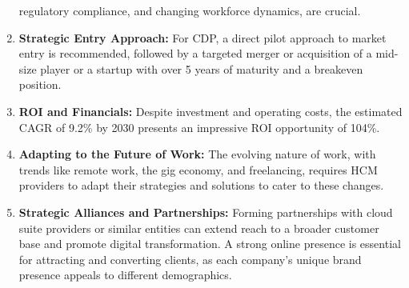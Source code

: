 \documentclass[
  a4paper,
]{book}
\begin{document}
\begin{enumerate}
  regulatory compliance, and changing workforce dynamics, are crucial.
\item
  \textbf{Strategic Entry Approach:} For CDP, a direct pilot approach to
  market entry is recommended, followed by a targeted merger or
  acquisition of a mid-size player or a startup with over 5 years of
  maturity and a breakeven position.
\item
  \textbf{ROI and Financials:} Despite investment and operating costs,
  the estimated CAGR of 9.2\% by 2030 presents an impressive ROI
  opportunity of 104\%.
\item
  \textbf{Adapting to the Future of Work:} The evolving nature of work,
  with trends like remote work, the gig economy, and freelancing,
  requires HCM providers to adapt their strategies and solutions to
  cater to these changes.
\item
  \textbf{Strategic Alliances and Partnerships:} Forming partnerships
  with cloud suite providers or similar entities can extend reach to a
  broader customer base and promote digital transformation. A strong
  online presence is essential for attracting and converting clients, as
  each company's unique brand presence appeals to different
  demographics.
\end{enumerate}


\backmatter
\end{document}
